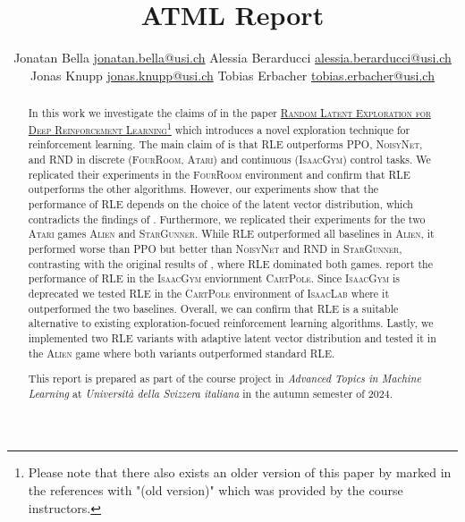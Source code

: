 \documentclass[10pt]{article} %
\title{ATML Report}
\author{%
  \name Jonatan Bella \email \href{mailto:jonatan.bella@usi.ch}{jonatan.bella@usi.ch}
  \AND
  \name Alessia Berarducci \email \href{mailto:alessia.berarducci@usi.ch}{alessia.berarducci@usi.ch}
  \AND
  \name Jonas Knupp \email \href{mailto:jonas.knupp@usi.ch}{jonas.knupp@usi.ch}
  \AND
  \name Tobias Erbacher \email \href{mailto:tobias.erbacher@usi.ch}{tobias.erbacher@usi.ch}
}
\begin{document}
\maketitle

\begin{abstract}
In this work we investigate the claims of \cite{rle-paper} in the paper \href{https://arxiv.org/abs/2407.13755}{\textsc{Random Latent Exploration for Deep Reinforcement Learning}}\footnote{Please note that there also exists an older version of this paper by \cite{rle-paper-old} marked in the references with "(old version)" which was provided by the course instructors.} which introduces a novel exploration technique for reinforcement learning. The main claim of \cite{rle-paper} is that \textsc{RLE} outperforms \textsc{PPO}, \textsc{NoisyNet}, and \textsc{RND} in discrete (\textsc{FourRoom}, \textsc{Atari}) and continuous (\textsc{IsaacGym}) control tasks. We replicated their experiments in the \textsc{FourRoom} environment and confirm that \textsc{RLE} outperforms the other algorithms. However, our experiments show that the performance of \textsc{RLE} depends on the choice of the latent vector distribution, which contradicts the findings of \cite{rle-paper}. Furthermore, we replicated their experiments for the two \textsc{Atari} games \textsc{Alien} and \textsc{StarGunner}. While \textsc{RLE} outperformed all baselines in \textsc{Alien}, it performed worse than \textsc{PPO} but better than \textsc{NoisyNet} and \textsc{RND} in \textsc{StarGunner}, contrasting with the original results of \cite{rle-paper}, where \textsc{RLE} dominated both games. \cite{rle-paper} report the performance of \textsc{RLE} in the \textsc{IsaacGym} enviornment \textsc{CartPole}. Since \textsc{IsaacGym} is deprecated we tested \textsc{RLE} in the \textsc{CartPole} environment of \textsc{IsaacLab} where it outperformed the two baselines. Overall, we can confirm that \textsc{RLE} is a suitable alternative to existing exploration-focued reinforcement learning algorithms. Lastly, we implemented two \textsc{RLE} variants with adaptive latent vector distribution and tested it in the \textsc{Alien} game where both variants outperformed standard \textsc{RLE}.


This report is prepared as part of the course project in \textit{Advanced Topics in Machine Learning} at \textit{Università della Svizzera italiana} in the autumn semester of $2024$. 
\end{abstract}

\vspace{-18pt}
\end{document}
